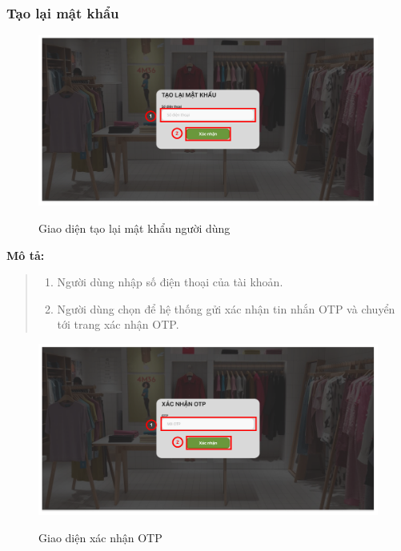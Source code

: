     \subsubsection{Tạo lại mật khẩu}
    \begin{figure}[!htp]
        \centering
        \includegraphics[width=5in]{img/UI/customer/reset_new_password.png}
        \label{3}
        \newline
        \caption{Giao diện tạo lại mật khẩu người dùng}
    \end{figure}
    \textbf{Mô tả:}
    \begin{quote}
        \begin{enumerate}
            \item Người dùng nhập số điện thoại của tài khoản.
            \item Người dùng chọn để hệ thống gửi xác nhận tin nhắn OTP và chuyển tới trang xác nhận OTP.
        \end{enumerate}
    \end{quote}
    \begin{figure}[!htp]
        \centering
        \includegraphics[width=5in]{img/UI/customer/confirm_otp.png}
        \label{4}
        \newline
        \caption{Giao diện xác nhận OTP}
    \end{figure}
